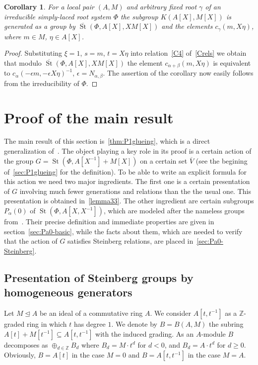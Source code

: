 \documentclass[oneside, 8pt]{amsart}
\newtheorem{corollary}[lemma]{Corollary}
\theoremstyle{remark}
\theoremstyle{definition}
\numberwithin{lemma}{section}
\numberwithin{prop}{section}
\numberwithin{corollary}{section}
\numberwithin{externaltheorem}{section}
\DeclareMathOperator{\St}{St}
\newcommand{\inv}{^{-1}}
\numberwithin{equation}{section}
\begin{document}
\begin{corollary} \label{Kgen-strong} For a local pair $(A, M)$ and arbitrary fixed root $\gamma$ of an irreducible simply-laced root system $\Phi$ the subgroup $K(A[X], M[X])$ is generated as a group by $\overline{\St}(\Phi, A[X], XM[X])$ and the elements $c_{\gamma}(m, X\eta)$, where $m \in M$, $\eta \in A[X]$. \end{corollary}
\begin{proof} Substituting $\xi = 1$, $s = m$, $t = X\eta$ into relation~\eqref{C4} of~\cref{Crels} we obtain that modulo 
 $\overline{\St}(\Phi, A[X], XM[X])$ the element $c_{\alpha + \beta}(m, X\eta)$ is equivalent to $c_{\alpha}(-\epsilon m, -\epsilon X \eta)^{-1}$, $\epsilon = N_{\alpha, \beta}$. The assertion of the corollary now easily follows from the irreducibility of $\Phi$. \end{proof}   

\section{Proof of the main result}
The main result of this section is~\cref{thm:P1glueing}, which is a direct generalization of~\cite[Proposition~4.3]{Tu83}. 
The object playing a key role in its proof is a certain action of the group $G = \St(\Phi, A[X\inv] + M[X])$ on a certain set $\overline{V}$ (see the begining of~\cref{sec:P1glueing} for the definition). To be able to write an explicit formula for this action we need two major ingredients. The first one is a certain presentation of $G$ involving much fewer generations and relations than the the usual one. This presentation is obtained in~\cref{lemma33}. The other ingredient are certain subgroups $P_\alpha(0)$ of $\St(\Phi, A[X, X\inv])$, which are modeled after the nameless groups from~\cite[Lemma~3.4]{Tu83}. Their precise definition and immediate properties are given in section~\ref{sec:Pa0-basic}, while the facts about them, which are needed to verify that the action of $G$ satisfies Steinberg relations, are placed in~\cref{sec:Pa0-Steinberg}.

\subsection{Presentation of Steinberg groups by homogeneous generators}
\label{sec:presentation}
Let $M\trianglelefteq A$ be an ideal of a commutative ring $A$.
We consider $A[t, t\inv]$ as a $\mathbb{Z}$-graded ring in which $t$ has degree $1$.
We denote by $B = B(A, M)$ the subring $A[t] + M[t\inv] \subseteq A[t, t\inv]$ with the induced grading.
As an $A$-module $B$ decomposes as $\oplus_{d\in\mathbb Z}B_d$ where $B_d=M \cdot t^d$ for $d<0$, and $B_d=A \cdot t^d$ for $d\geq0$. Obviously, $B = A[t]$ in the case $M=0$ and $B = A[t, t\inv]$ in the case $M=A$.
\end{document}
